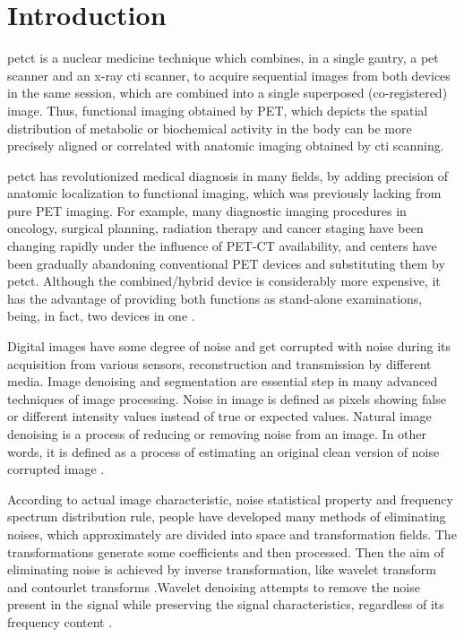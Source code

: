 \chapter{Introduction}
\label{chap:introduction}

\gls {petct} is a nuclear medicine technique which combines, in a single gantry, a \gls {pet} scanner and an x-ray \gls {cti} scanner, to acquire sequential images from both devices in the same session, which are combined into a single superposed (co-registered) image. Thus, functional imaging obtained by PET, which depicts the spatial distribution of metabolic or biochemical activity in the body can be more precisely aligned or correlated with anatomic imaging obtained by \gls {cti} scanning.

\gls {petct} has revolutionized medical diagnosis in many fields, by adding precision of anatomic localization to functional imaging, which was previously lacking from pure PET imaging. For example, many diagnostic imaging procedures in oncology, surgical planning, radiation therapy and cancer staging have been changing rapidly under the influence of PET-CT availability, and centers have been gradually abandoning conventional PET devices and substituting them by \gls {petct}. Although the combined/hybrid device is considerably more expensive, it has the advantage of providing both functions as stand-alone examinations, being, in fact, two devices in one \cite{belohlavek2008role}.

 Digital images have some degree of noise and get corrupted with noise during its acquisition from various sensors, reconstruction and transmission by different media. Image denoising and segmentation are essential step in many advanced techniques of image processing\cite{verma2013comparative}. Noise in image is defined as pixels showing false or different intensity values instead of true or expected values. Natural image denoising is a process of reducing or removing noise from an image. In other words, it is defined as a process of estimating an original clean version of noise corrupted image \cite{levin2011natural}.

 According to actual image characteristic, noise statistical property and frequency spectrum distribution rule, people have developed many methods of eliminating noises, which approximately are divided into space and transformation fields. The transformations generate some coefficients  and then  processed. Then the aim of eliminating noise is achieved by inverse transformation, like wavelet transform and contourlet transforms \cite{ruikar2011wavelet}\cite{matalon2005image}.Wavelet denoising attempts to remove the noise present in the signal while preserving the signal characteristics, regardless of its frequency content \cite{rangarajan2002image}.

